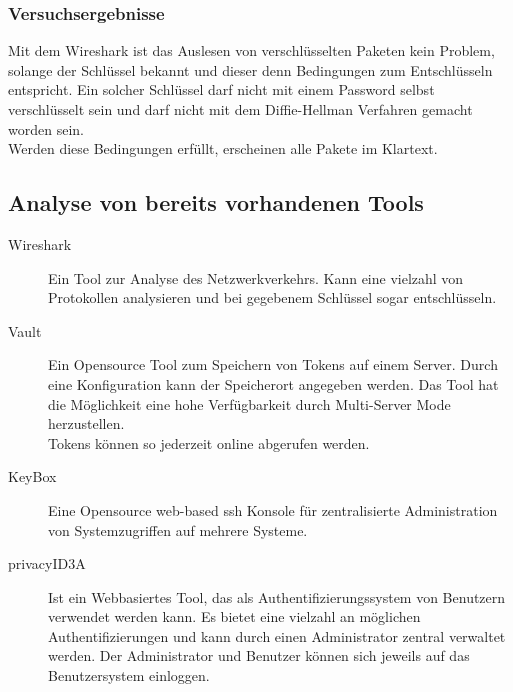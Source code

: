 	\subsubsection{Versuchsergebnisse}
	Mit dem Wireshark ist das Auslesen von verschlüsselten Paketen kein Problem, solange der Schlüssel bekannt und dieser denn Bedingungen zum Entschlüsseln entspricht. Ein solcher Schlüssel darf nicht mit einem Password selbst verschlüsselt sein und darf nicht mit dem Diffie-Hellman Verfahren gemacht worden sein.\\
	Werden diese Bedingungen erfüllt, erscheinen alle Pakete im Klartext. 
	
	\subsection{Analyse von bereits vorhandenen Tools} %
	\begin{description}
		\item[Wireshark] Ein Tool zur Analyse des Netzwerkverkehrs. Kann eine vielzahl von Protokollen analysieren und bei gegebenem Schlüssel sogar entschlüsseln.
		\item[Vault] Ein Opensource Tool zum Speichern von Tokens auf einem Server. Durch eine Konfiguration kann der Speicherort angegeben werden. Das Tool hat die Möglichkeit eine hohe Verfügbarkeit durch Multi-Server Mode herzustellen.\\
		Tokens können so jederzeit online abgerufen werden.
		\item[KeyBox] Eine Opensource web-based ssh Konsole für zentralisierte Administration von Systemzugriffen auf mehrere Systeme.
		\item[privacyID3A] Ist ein Webbasiertes Tool, das als Authentifizierungssystem von Benutzern verwendet werden kann. Es bietet eine vielzahl an möglichen Authentifizierungen und kann durch einen Administrator zentral verwaltet werden. Der Administrator und Benutzer können sich jeweils auf das Benutzersystem einloggen.
	\end{description}